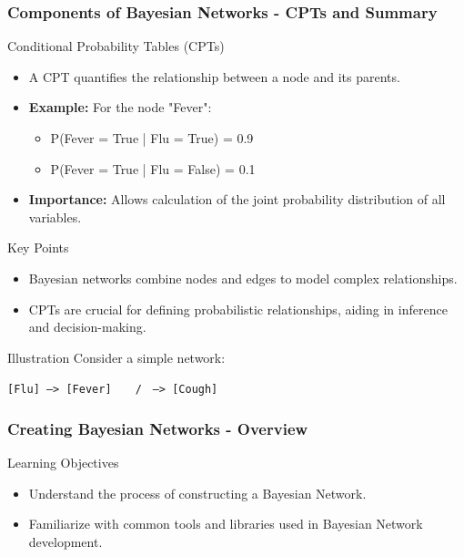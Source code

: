 \documentclass[aspectratio=169]{beamer}
\begin{document}
\begin{frame}[fragile]
    \frametitle{Components of Bayesian Networks - CPTs and Summary}
    \begin{block}{Conditional Probability Tables (CPTs)}
        \begin{itemize}
            \item A CPT quantifies the relationship between a node and its parents.
            \item \textbf{Example:} For the node "Fever":
            \begin{itemize}
                \item P(Fever = True | Flu = True) = 0.9
                \item P(Fever = True | Flu = False) = 0.1
            \end{itemize}
            \item \textbf{Importance:} Allows calculation of the joint probability distribution of all variables.
        \end{itemize}
    \end{block}

    \begin{block}{Key Points}
        \begin{itemize}
            \item Bayesian networks combine nodes and edges to model complex relationships.
            \item CPTs are crucial for defining probabilistic relationships, aiding in inference and decision-making.
        \end{itemize}
    \end{block}

    \begin{block}{Illustration}
        Consider a simple network: 
        \begin{center}
            \texttt{[Flu] ---> [Fever]}
            \newline
            \texttt{      \ \  /}
            \newline
            \texttt{       ---> [Cough]}
        \end{center}
    \end{block}
\end{frame}

\begin{frame}[fragile]
    \frametitle{Creating Bayesian Networks - Overview}
    \begin{block}{Learning Objectives}
        \begin{itemize}
            \item Understand the process of constructing a Bayesian Network.
            \item Familiarize with common tools and libraries used in Bayesian Network development.
        \end{itemize}
    \end{block}
\end{frame}
\end{document}
